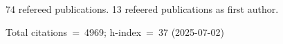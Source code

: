 74 refereed publications. 13 refeered publications as first author.

Total citations~=~4969; h-index~=~37 (2025-07-02)
